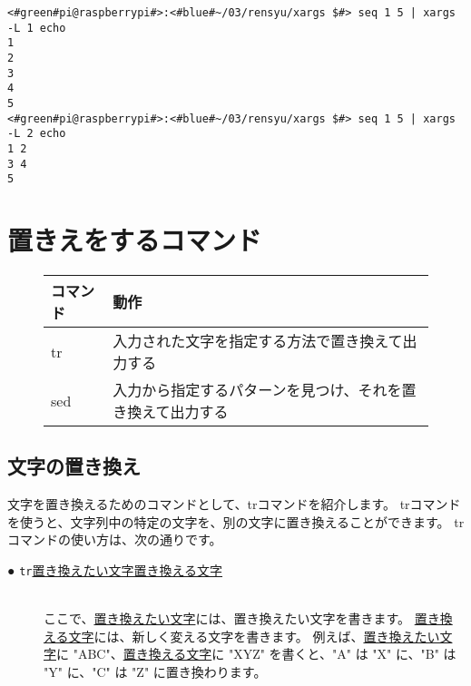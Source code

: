\begin{lstlisting}[caption=xargsコマンドのオプションL]
<#green#pi@raspberrypi#>:<#blue#~/03/rensyu/xargs $#> seq 1 5 | xargs -L 1 echo
1
2
3
4
5
<#green#pi@raspberrypi#>:<#blue#~/03/rensyu/xargs $#> seq 1 5 | xargs -L 2 echo
1 2
3 4
5
\end{lstlisting}

\begin{tcolorbox}[title=\useOmetoi]
    \begin{enumerate}
    \end{enumerate}
\end{tcolorbox}



\newpage
\section{置きえをするコマンド}
\begin{figure}[h]
    \begin{tabular}{ll}
    コマンド & 動作                                                       \\ \hline
    tr       & 入力された文字を指定する方法で置き換えて出力する           \\
    sed      & 入力から指定するパターンを見つけ、それを置き換えて出力する \\ \hline
    \end{tabular}
\end{figure}

\subsection{文字の置き換え}
文字を置き換えるためのコマンドとして、trコマンドを紹介します。
trコマンドを使うと、文字列中の特定の文字を、別の文字に置き換えることができます。
trコマンドの使い方は、次の通りです。


\begin{description}
    \item[● \texttt{tr}\textvisiblespace \underline{置き換えたい文字}\textvisiblespace \underline{置き換える文字}]\mbox{}\\
    ここで、\underline{置き換えたい文字}には、置き換えたい文字を書きます。
    \underline{置き換える文字}には、新しく変える文字を書きます。
    例えば、\underline{置き換えたい文字}に "ABC"、\underline{置き換える文字}に "XYZ" を書くと、"A" は "X" に、"B" は "Y" に、"C" は "Z"
    に置き換わります。
\end{description}


